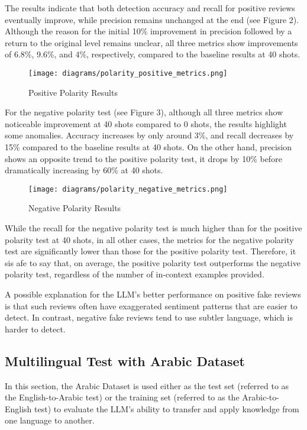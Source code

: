 \documentclass[sigconf, nonacm]{acmart}
\theoremstyle{definition}
\begin{document}
The results indicate that both detection accuracy and recall for positive reviews eventually improve, while precision remains unchanged at the end (see Figure 2). Although the reason for the initial 10\% improvement in precision followed by a return to the original level remains unclear, all three metrics show improvements of 6.8\%, 9.6\%, and 4\%, respectively, compared to the baseline results at 40 shots.

\begin{figure}[h]
  \centering
  \texttt{[image: diagrams/polarity\_positive\_metrics.png]}
  \caption{Positive Polarity Results}
\end{figure}

For the negative polarity test (see Figure 3), although all three metrics show noticeable improvement at 40 shots compared to 0 shots, the results highlight some anomalies. Accuracy increases by only around 3\%, and recall decreases by 15\% compared to the baseline results at 40 shots. On the other hand, precision shows an opposite trend to the positive polarity test, it drops by 10\% before dramatically increasing by 60\% at 40 shots.

\begin{figure}[h]
  \centering
  \texttt{[image: diagrams/polarity\_negative\_metrics.png]}
  \caption{Negative Polarity Results}
\end{figure}

While the recall for the negative polarity test is much higher than for the positive polarity test at 40 shots, in all other cases, the metrics for the negative polarity test are significantly lower than those for the positive polarity test. Therefore, it sis afe to say that, on average, the positive polarity test outperforms the negative polarity test, regardless of the number of in-context examples provided.

A possible explanation for the LLM's better performance on positive fake reviews is that such reviews often have exaggerated sentiment patterns that are easier to detect. In contrast, negative fake reviews tend to use subtler language, which is harder to detect.

\subsection{Multilingual Test with Arabic Dataset}
In this section, the Arabic Dataset is used either as the test set (referred to as the English-to-Arabic test) or the training set (referred to as the Arabic-to-English test) to evaluate the LLM's ability to transfer and apply knowledge from one language to another.
\end{document}
